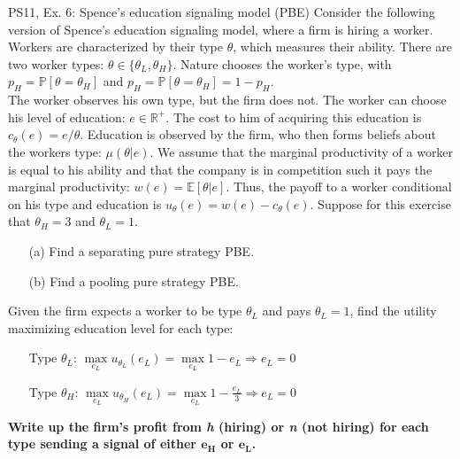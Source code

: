 \begin{frame}{PS11, Ex. 6: Spence’s education signaling model (PBE)}
    Consider the following version of Spence’s education signaling model, where a firm is hiring a worker. Workers are characterized by their type $\theta$, which measures their ability. There are two worker types: $\theta\in\{\theta_L,\theta_H\}$. Nature chooses the worker’s type, with $p_H=\mathbb{P}[\theta=\theta_H]$ and $p_H=\mathbb{P}[\theta=\theta_H]=1-p_H$.\\\vspace{2pt}
    The worker observes his own type, but the firm does not. The worker can choose his level of education: $e\in\mathbb{R}^{+}$. The cost to him of acquiring this education is $c_\theta(e)=e/\theta$. Education is observed by the firm, who then forms beliefs about the workers type: $\mu(\theta|e)$. We assume that the marginal productivity of a worker is equal to his ability and that the company is in competition such it pays the marginal productivity: $w(e)=\mathbb{E}[\theta|e]$. Thus, the payoff to a worker conditional on his type and education is $u_\theta(e)=w(e)-c_\theta(e)$. Suppose for this exercise that $\theta_H=3$ and $\theta_L=1$.\vspace{-6pt}
    \begin{multicols}{2}
      \begin{itemize}
        \item[(a)] Find a separating pure strategy PBE.
        \item[(b)] Find a pooling pure strategy PBE.
      \end{itemize}\vspace{-6pt}
      Given the firm expects a worker to be type $\theta_L$ and pays $\theta_L=1$, find the utility maximizing education level for each type:\vspace{-14pt}
      \begin{itemize}
        \item[Type $\theta_L$:] $\max\limits_{e_L}u_{\theta_L}(e_L)=\max\limits_{e_L}1-e_L\Rightarrow e_L=0$\\
        \item[Type $\theta_H$:] $\max\limits_{e_L}u_{\theta_H}(e_L)=\max\limits_{e_L}1-\frac{e_L}{3}\Rightarrow e_L=0$
      \end{itemize}\vspace{-4pt}
      \textbf{Write up the firm's profit from \textit{h} (hiring) or \textit{n} (not hiring) for each type sending a signal of either $\bm{e_H}$ or $\bm{e_L}$.}
      \vfill\null\columnbreak
      \vfill\null
    \end{multicols}
\end{frame}
